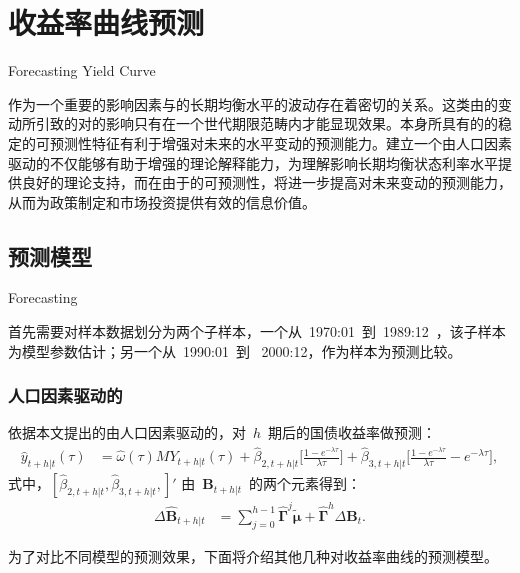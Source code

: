 
\chapter{收益率曲线预测}{Forecasting Yield Curve}
\label{chap05}

\ds 作为一个重要的影响因素与\ts 的长期均衡水平的波动存在着密切的关系。这类由\ds 的变动所引致的对\tsm 的影响只有在一个世代期限范畴内才能显现效果。\dsf 本身所具有的的稳定的可预测性特征有利于增强对未来\ts 的水平变动的预测能力。建立一个由人口因素驱动的\tsm 不仅能够有助于增强\tsm 的理论解释能力，为理解影响长期均衡状态利率水平提供良好的理论支持，而在由于\dsf 的可预测性，将进一步提高对未来\tsm 变动的预测能力，从而为政策制定和市场投资提供有效的信息价值。

\section{预测模型}{Forecasting}

首先需要对样本数据划分为两个子样本，一个从~1970:01~到~1989:12~，该子样本为模型参数估计；另一个从~1990:01~到~ 2000:12，作为样本为预测比较。

\subsection{人口因素驱动的\dns}
依据本文提出的由人口因素驱动的\dns ，对~$h$~期后的国债收益率做预测：
 \begin{align}
   \hat{y}_{t+h|t}(\tau) & = \hat{\omega}(\tau) MY_{t+h|t}(\tau)
        + \hat{\beta}_{2,t+h|t} \big[\frac{1-e^{-\lambda \tau}} {\lambda \tau} \big]  + \hat{\beta}_{3,t+h|t}\big[\frac{1-e^{-\lambda \tau}} {\lambda \tau} - e^{-\lambda \tau} \big],
 \end{align}
 式中，$[
      \hat{\beta}_{2,t+h|t},
       \hat{\beta}_{3,t+h|t},
    ]'$
 由~$\mathbf{\hat{B}}_{t+h|t}$~的两个元素得到：
  \begin{align}
   \Delta\mathbf{\hat{B}}_{t+h|t}
    &=\sum_{j=0}^{h-1}\mathbf{\hat{\Gamma}}^j \mathbf{\tilde{\mu}}
     +\mathbf{\hat{\Gamma}}^h \Delta\mathbf{\hat{B}}_t.
 \end{align}

为了对比不同模型的预测效果，下面将介绍其他几种对收益率曲线的预测模型。


